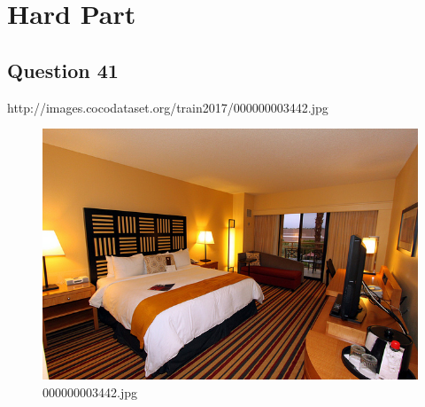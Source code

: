 \section{Hard Part}
\subsection*{Question 41}
http://images.cocodataset.org/train2017/000000003442.jpg
\begin{figure}[h]
    \centering
    \includegraphics[width=0.8\linewidth]{../image set/hard/000000003442.jpg}
    \caption{000000003442.jpg}
\end{figure}
